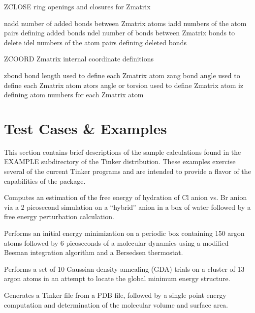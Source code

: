 \documentclass[letterpaper,11pt,english]{sphinxmanual}
\begin{document}
ZCLOSE  ring openings and closures for Z\sphinxhyphen{}matrix

nadd    number of added bonds between Z\sphinxhyphen{}matrix atoms
iadd    numbers of the atom pairs defining added bonds
ndel    number of bonds between Z\sphinxhyphen{}matrix bonds to delete
idel    numbers of the atom pairs defining deleted bonds

ZCOORD  Z\sphinxhyphen{}matrix internal coordinate definitions

zbond   bond length used to define each Z\sphinxhyphen{}matrix atom
zang    bond angle used to define each Z\sphinxhyphen{}matrix atom
ztors   angle or torsion used to define Z\sphinxhyphen{}matrix atom
iz      defining atom numbers for each Z\sphinxhyphen{}matrix atom


\chapter{Test Cases \& Examples}
\label{\detokenize{text/test-cases:test-cases-examples}}\label{\detokenize{text/test-cases::doc}}
This section contains brief descriptions of the sample calculations found in the EXAMPLE subdirectory of the Tinker distribution. These examples exercise several of the current Tinker programs and are intended to provide a flavor of the capabilities of the package.


Computes an estimation of the free energy of hydration of Cl\sphinxhyphen{} anion vs. Br\sphinxhyphen{} anion via a 2 picosecond simulation on a “hybrid” anion in a box of water followed by a free energy perturbation calculation.


Performs an initial energy minimization on a periodic box containing 150 argon atoms followed by 6 picoseconds of a molecular dynamics using a modified Beeman integration algorithm and a Bersedsen thermostat.


Performs a set of 10 Gaussian density annealing (GDA) trials on a cluster of 13 argon atoms in an attempt to locate the global minimum energy structure.


Generates a Tinker file from a PDB file, followed by a single point energy computation and determination of the molecular volume and surface area.
\end{document}
